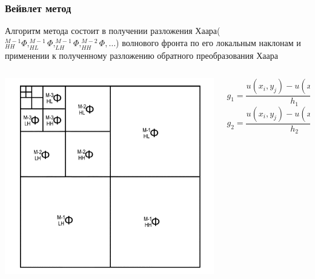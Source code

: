 \documentclass[11pt]{beamer}
\begin{document}
\begin{frame}
\frametitle{Вейвлет метод}


\begin{block}{}
Алгоритм метода состоит в получении разложения Хаара($_{HH}^{M-1}\Phi, _{HL}^{M-1}\Phi, _{LH}^{M-1}\Phi, _{HH}^{M-2}\Phi, \ldots $) волнового фронта по его локальным наклонам и применении к полученному разложению обратного преобразования Хаара
\end{block}

\begin{columns}
\begin{column}{0.5\textwidth}
\includegraphics[width=\linewidth]{hwaf_decomp.png}
\end{column}

\begin{column}{0.5\textwidth}
$$g_1= \frac{u(x_i,y_j) - u(x_{i-1},y_j)}{h_1}$$
$$g_2= \frac{u(x_i,y_j) - u(x_i,y_{j-1})}{h_2}$$
\end{column}
\end{columns}
\end{frame}
\end{document}
